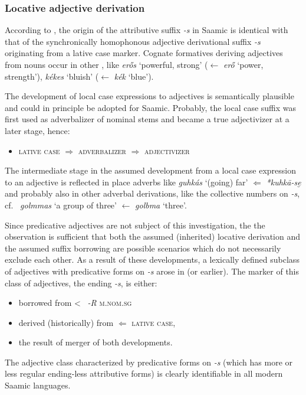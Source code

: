 {\subsubsection{Locative adjective derivation}
According to \citet[96]{bergsland1946}, the origin of the attributive suffix \textit{-s} in Saamic is identical with that of the synchronically homophonous adjective derivational suffix \textit{-s} originating from a lative case marker. Cognate formatives deriving adjectives from nouns occur in other , like  \textit{erős} ‘powerful, strong’ ($\leftarrow$ \textit{erő} ‘power, strength’), \textit{kékes} ‘bluish’ ($\leftarrow$ \textit{kék} ‘blue’).

The development of local case expressions to adjectives is semantically plausible and could in principle be adopted for Saamic. Probably, the local case suffix was first used as adverbalizer of nominal stems and became a true adjectivizer at a later stage, hence:
\begin{itemize}
\item \textsc{lative case} $\Rightarrow$ \textsc{adverbalizer} $\Rightarrow$ \textsc{adjectivizer}
\end{itemize}
The intermediate stage in the assumed development from a local case expression to an adjective is reflected in place adverbs like  \textit{guhkás} ‘(going) far’ $\Leftarrow$  \textit{*kuhkā-se̮} \cite[246]{sammallahti1998b} and probably also in other adverbal derivations, like the collective numbers on \textit{-s}, cf.~ \textit{golmmas} ‘a group of three’ $\leftarrow$ \textit{golbma} ‘three’.

Since predicative adjectives are not subject of this investigation, the the observation is sufficient that both the assumed (inherited) locative derivation and the assumed suffix borrowing are possible scenarios which do not necessarily exclude each other. As a result of these developments, a lexically defined subclass of adjectives with predicative forms on \textit{-s} arose in  (or earlier). The marker of this class of adjectives, the ending \textit{-s}, is either:
\begin{itemize}
\item borrowed from <~ \textit{-R} \textsc{m.nom.sg}
\item derived (historically) from $\Leftarrow$ \textsc{lative case}, %
\item the result of merger of both developments.
\end{itemize}
\noindent The adjective class characterized by predicative forms on \textit{-s} (which has more or less regular ending-less attributive forms) is clearly identifiable in all modern Saamic languages.

}
